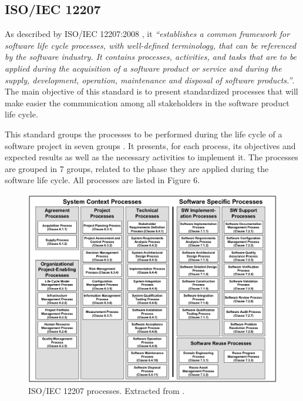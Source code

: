\subsection{ISO/IEC 12207}

As described by ISO/IEC 12207:2008 \cite{ISO12207}, it \textit{``establishes a common framework for software life cycle processes, with well-defined terminology, that can be referenced by the software industry. It contains processes, activities, and tasks that are to be applied during the acquisition of a software product or service and during the supply, development, operation, maintenance and disposal of software products.''}. The main objective of this standard is to present standardized processes that will make easier the communication among all stakeholders in the software product life cycle.\par
This standard groups the processes to be performed during the life cycle of a software project in seven groups . It presents, for each process, its objectives and expected results as well as the necessary activities to implement it. The processes are grouped in 7 groups, related to the phase they are applied during the software life cycle. All processes are listed in Figure 6.\par
 
\begin{figure}[h!]
\centering
\includegraphics[width=\textwidth]{img/ISO12207Processes.png}
\caption{ISO/IEC 12207 processes. Extracted from \cite{ISO12207}.}
\end{figure}

